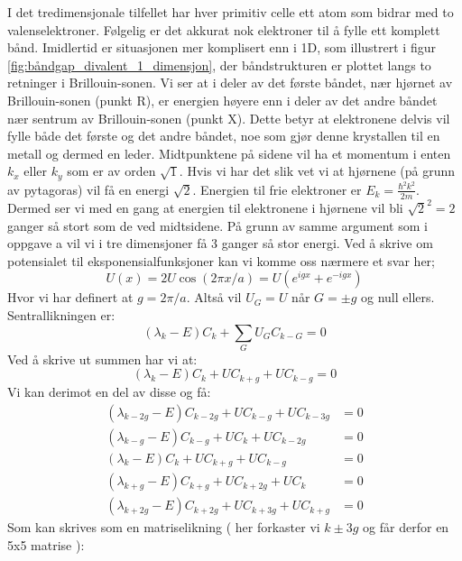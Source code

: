\documentclass{article}
\begin{document}
I det tredimensjonale tilfellet har hver primitiv celle ett atom som bidrar med to valenselektroner. Følgelig er det akkurat nok elektroner til å fylle ett komplett bånd. Imidlertid er situasjonen mer komplisert enn i 1D, som illustrert i figur \ref{fig:båndgap_divalent_1_dimensjon}, der båndstrukturen er plottet langs to retninger i Brillouin-sonen. Vi ser at i deler av det første båndet, nær hjørnet av Brillouin-sonen (punkt R), er energien høyere enn i deler av det andre båndet nær sentrum av Brillouin-sonen (punkt X). Dette betyr at elektronene delvis vil fylle både det første og det andre båndet, noe som gjør denne krystallen til en metall og dermed en leder.
Midtpunktene på sidene vil ha et momentum i enten $k_x$ eller $k_y$ som er av orden $\sqrt{1}$. Hvis vi har det slik vet vi at hjørnene (på grunn av pytagoras) vil få en energi $\sqrt{2}$. Energien til frie elektroner er $E_k = \frac{\hbar^2k^2}{2m}$. Dermed ser vi med en gang at energien til elektronene i hjørnene vil bli $\sqrt{2}^2 = 2$ ganger så stort som de ved midtsidene.
På grunn av samme argument som i oppgave a vil vi i tre dimensjoner få 3 ganger så stor energi.
Ved å skrive om potensialet til eksponensialfunksjoner kan vi komme oss nærmere et svar her;
\begin{equation}
    U(x) = 2 U \cos(2\pi x / a) = U (e^{igx}+e^{-igx})
\end{equation}
Hvor vi har definert at $g = 2 \pi / a$. Altså vil $U_G = U$ når $G = \pm g$ og null ellers.
Sentrallikningen er:
\begin{equation}
    (\lambda_k - E)C_k + \sum_G U_G C_{k-G} = 0
\end{equation}
Ved å skrive ut summen har vi at:
\begin{equation}
    (\lambda_k - E)C_k + U C_{k+g}+  U C_{k-g} = 0
\end{equation}
Vi kan derimot en del av disse og få:
\begin{align}
    (\lambda_{k-2g} - E)C_{k-2g} + U C_{k-g}+  U C_{k-3g} &= 0\\
    (\lambda_{k-g}- E)C_{k-g} + U C_{k}+  U C_{k-2g} &= 0\\
    (\lambda_k - E)C_k + U C_{k+g}+  U C_{k-g} &= 0\\
    (\lambda_{k+g} - E)C_{k+g}+ U C_{k+2g}+  U C_{k} &= 0\\
    (\lambda_{k+2g}- E)C_{k+2g} + U C_{k+3g}+  U C_{k+g} &= 0
\end{align}
Som kan skrives som en matriselikning ( her forkaster vi $k\pm3g$ og får derfor en 5x5 matrise ):
\end{document}
